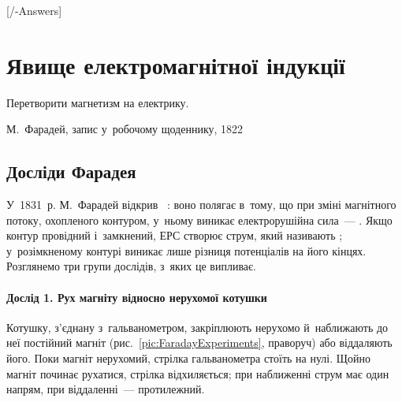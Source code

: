 
[\currfilebase/\currfilebase-Answers]

\chapter{Явище електромагнітної індукції}\label{\currfilebase}\hypertarget{ElMagInduction}{}

\graphicspath{{\currfilebase/Pictures}}
\epigraph{\Alexander Перетворити магнетизм на електрику.}{М.~Фарадей, запис у~робочому щоденнику, 1822}

\section{Досліди Фарадея}\hypertarget{induction-phenomenon}{}

У~1831~р. М.~Фарадей відкрив~\cite{Faraday1832} : воно полягає в~тому,
що при зміні магнітного потоку, охопленого контуром, у~ньому виникає електрорушійна сила~--- .
Якщо контур провідний і~замкнений, ЕРС створює струм, який називають ; у~розімкненому контурі виникає лише різниця
потенціалів на його кінцях. Розглянемо три групи дослідів, з~яких це випливає.

\subsubsection*{Дослід 1. Рух магніту відносно нерухомої котушки}
Котушку, з'єднану з~гальванометром, закріплюють нерухомо й~наближають до неї постійний
магніт (рис.~\ref{pic:FaradayExperiments}, праворуч) або віддаляють його. Поки магніт нерухомий, стрілка гальванометра стоїть на нулі.
Щойно магніт починає рухатися, стрілка відхиляється; при наближенні струм має один напрям, при віддаленні~--- протилежний.

